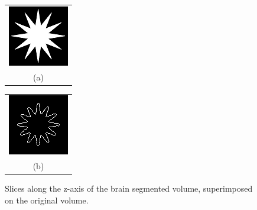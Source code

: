 \begin{figure}[h!]
\centering
\begin{minipage}{.35\textwidth}
\begin{tabular}{c}
\includegraphics[width=.9\textwidth]{results/2D/starZero} \\
(a)
\end{tabular}
\end{minipage}
\begin{minipage}{.35\textwidth}
\begin{tabular}{c}
\includegraphics[width=.9\textwidth]{results/2D/starZeroFullSeg} \\
(b)
\end{tabular}
\end{minipage}
\caption{Slices along the z-axis of the brain segmented volume, superimposed on the original volume.}
\label{brainSegSlicees}
\end{figure}

